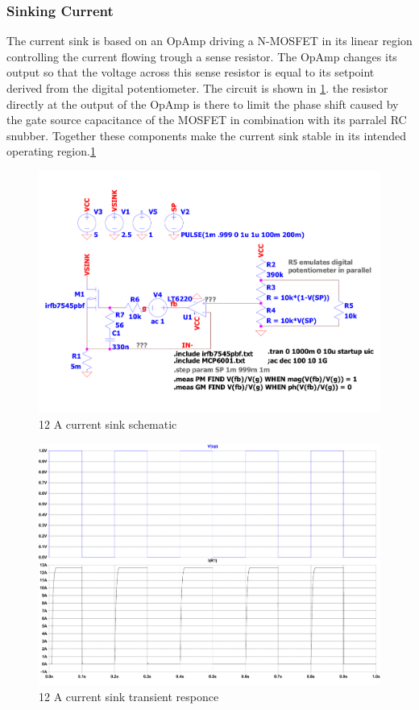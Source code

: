 \subsubsection{Sinking Current}
The current sink is based on an OpAmp driving a N-MOSFET in its linear region controlling the current flowing trough a sense resistor. The OpAmp changes its output so that the voltage across this sense resistor is equal to its setpoint derived from the digital potentiometer. The circuit is shown in \ref{fig:CurrentSinkSchematic}. the resistor directly at the output of the OpAmp is there to limit the phase shift caused by the gate source capacitance of the MOSFET in combination with its parralel RC snubber. Together these components make the current sink stable in its intended operating region.\ref{fig:CurrentSinkSchematic}

\begin{figure}[h!]
    \centering
    \includegraphics[scale=0.3]{CurrentSinkSchematic.pdf}
    \caption{12 A current sink schematic}
    \label{fig:CurrentSinkSchematic}
\end{figure}

\begin{figure}[h!]
    \centering
    \includegraphics[scale=0.3]{CurrentSinkTransient.pdf}
    \caption{12 A current sink transient responce}
    \label{fig:CurrentSinkTransient}
\end{figure}


